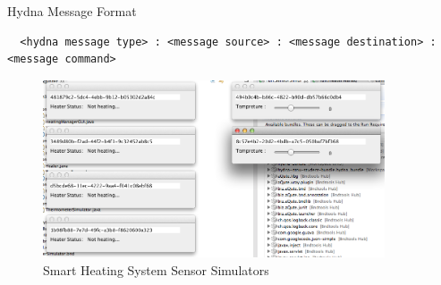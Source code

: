 \begin{algorithm}[h]
  \caption{Hydna Message Format}
  \label{code:message_format}
  \begin{verbatim}
  <hydna message type> : <message source> : <message destination> : <message command>
 \end{verbatim}
\end{algorithm}

\begin{figure}
	\centering    	
\includegraphics[width=0.90\textwidth,natwidth=610,natheight=642]{figs/sensor_simulators.png}
  	\caption{Smart Heating System Sensor Simulators}
  	\label{fig:sensor_simulators}
\end{figure}

\clearpage

